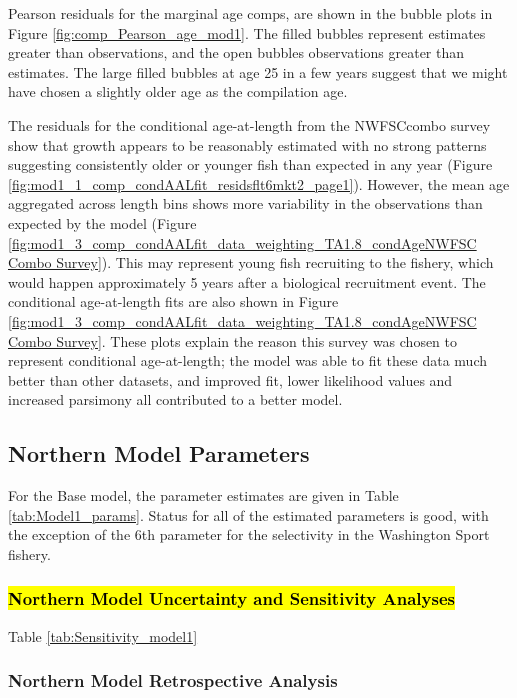 \documentclass[12pt,]{article}
\begin{document}
Pearson residuals for the marginal age comps, are shown in the bubble
plots in Figure \ref{fig:comp_Pearson_age_mod1}. The filled bubbles
represent estimates greater than observations, and the open bubbles
observations greater than estimates. The large filled bubbles at age 25
in a few years suggest that we might have chosen a slightly older age as
the compilation age.

The residuals for the conditional age-at-length from the NWFSCcombo
survey show that growth appears to be reasonably estimated with no
strong patterns suggesting consistently older or younger fish than
expected in any year (Figure
\ref{fig:mod1_1_comp_condAALfit_residsflt6mkt2_page1}). However, the
mean age aggregated across length bins shows more variability in the
observations than expected by the model (Figure
\ref{fig:mod1_3_comp_condAALfit_data_weighting_TA1.8_condAgeNWFSC Combo Survey}).
This may represent young fish recruiting to the fishery, which would
happen approximately 5 years after a biological recruitment event. The
conditional age-at-length fits are also shown in Figure
\ref{fig:mod1_3_comp_condAALfit_data_weighting_TA1.8_condAgeNWFSC Combo Survey}.
These plots explain the reason this survey was chosen to represent
conditional age-at-length; the model was able to fit these data much
better than other datasets, and improved fit, lower likelihood values
and increased parsimony all contributed to a better model.

\subsection{Northern Model Parameters}\label{northern-model-parameters}

For the Base model, the parameter estimates are given in Table
\ref{tab:Model1_params}. Status for all of the estimated parameters is
good, with the exception of the 6th parameter for the selectivity in the
Washington Sport fishery.

\subsubsection{\texorpdfstring{\hl{Northern Model Uncertainty and Sensitivity Analyses}}{}}\label{section}

Table \ref{tab:Sensitivity_model1}

\subsubsection{Northern Model Retrospective
Analysis}\label{northern-model-retrospective-analysis}
\end{document}
